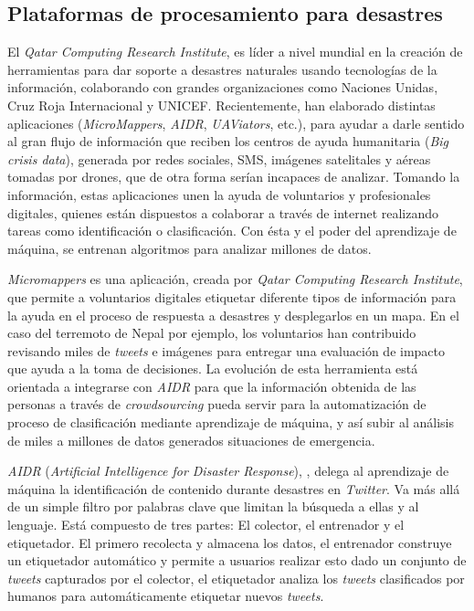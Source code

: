 \subsection{Plataformas de procesamiento para desastres}
\label{arte:PPDesastres}

El \textit{Qatar Computing Research Institute}, es líder a nivel mundial en la creación de herramientas para dar soporte a desastres naturales usando tecnologías de la información, colaborando con grandes organizaciones como Naciones Unidas, Cruz Roja Internacional y UNICEF. Recientemente, han elaborado distintas aplicaciones (\textit{MicroMappers}, \textit{AIDR}, \textit{UAViators}, etc.), para ayudar a darle sentido al gran flujo de información que reciben los centros de ayuda humanitaria (\textit{Big crisis data}), generada por redes sociales, SMS, imágenes satelitales y aéreas tomadas por drones, que de otra forma serían incapaces de analizar.
Tomando la información, estas aplicaciones unen la ayuda de voluntarios y profesionales digitales, quienes están dispuestos a colaborar a través de internet realizando tareas como identificación o clasificación. Con ésta y el poder del aprendizaje de máquina, se entrenan algoritmos para analizar millones de datos.

\textit{Micromappers} es una aplicación, creada por \textit{Qatar Computing Research Institute}, que permite a voluntarios digitales etiquetar diferente tipos de información para la ayuda en el proceso de respuesta a desastres y desplegarlos en un mapa. En el caso del terremoto de Nepal por ejemplo, los voluntarios han contribuido revisando miles de \textit{tweets} e imágenes para entregar una evaluación de impacto que ayuda a la toma de decisiones. La evolución de esta herramienta está orientada a integrarse con \textit{AIDR} para que la información obtenida de las personas a través de \textit{crowdsourcing} pueda servir para la automatización de proceso de clasificación mediante aprendizaje de máquina, y así subir al análisis de miles a millones de datos generados situaciones de emergencia.

\textit{AIDR} (\textit{Artificial Intelligence for Disaster Response}), \cite{AIDR}, delega al aprendizaje de máquina la identificación de contenido durante desastres en \textit{Twitter}. Va más allá de un simple filtro por palabras clave que limitan la búsqueda a ellas y al lenguaje. Está compuesto de tres partes: El colector, el entrenador y el etiquetador. El primero recolecta y almacena los datos, el entrenador construye un etiquetador automático y permite a usuarios realizar esto dado un conjunto de \textit{tweets} capturados por el colector, el etiquetador analiza los \textit{tweets} clasificados por humanos para automáticamente etiquetar nuevos \textit{tweets}.


